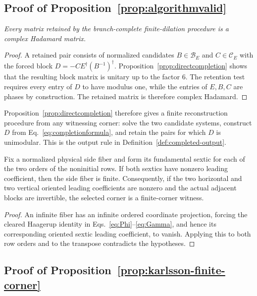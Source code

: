 \subsection{{Proof of Proposition~\ref{prop:algorithmvalid}}}
{\emph{Every matrix retained by the branch-complete finite-dilation procedure is a complex Hadamard matrix.}}

\begin{proof}
{A retained pair consists of normalized candidates $B\in\mathcal B_E$ and $C\in\mathcal C_E$ with the forced block $D=-CE^\dagger(B^{-1})^\dagger$. Proposition~\ref{prop:directcompletion} shows that the resulting block matrix is unitary up to the factor $6$. The retention test requires every entry of $D$ to have modulus one, while the entries of $E,B,C$ are phases by construction. The retained matrix is therefore complex Hadamard.}
\end{proof}

{Proposition~\ref{prop:directcompletion} therefore gives a finite reconstruction procedure from any witnessing corner: solve the two candidate systems, construct $D$ from Eq.~\eqref{eq:completionformula}, and retain the pairs for which $D$ is unimodular. This is the output rule in Definition~\ref{def:completed-output}.}

\begin{lemma}
\label{lem:supp-oriented-leading-finiteness}
Fix a normalized physical side fiber and form its fundamental sextic for each of the two orders of the noninitial rows. If both sextics have nonzero leading coefficient, then the side fiber is finite. Consequently, if the two horizontal and two vertical oriented leading coefficients are nonzero and the actual adjacent blocks are invertible, the selected corner is a finite-corner witness.
\end{lemma}

\begin{proof}
{An infinite fiber has an infinite ordered coordinate projection, forcing the cleared Haagerup identity in Eqs.~\eqref{eq:Phi}--\eqref{eq:Gamma}, and hence its corresponding oriented sextic leading coefficient, to vanish.  Applying this to both row orders and to the transpose contradicts the hypotheses.}
\end{proof}

\subsection{{Proof of Proposition~\ref{prop:karlsson-finite-corner}}}
\label{sec:supp-karlsson-witnesses}


